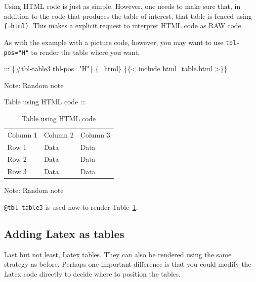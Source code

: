 \documentclass[
  12pt,
]{article}
\newenvironment{Shaded}{\begin{snugshade}}{\end{snugshade}}
\newcommand{\InformationTok}[1]{\textcolor[rgb]{0.37,0.37,0.37}{#1}}
\newcommand{\NormalTok}[1]{\textcolor[rgb]{0.00,0.23,0.31}{#1}}
\begin{document}
Using HTML code is just as simple. However, one needs to make sure that,
in addition to the code that produces the table of interest, that table
is fenced using
\texttt{\textasciigrave{}\textasciigrave{}\textasciigrave{}\{=html\}}.
This makes a explicit request to interpret HTML code as RAW code.

As with the example with a picture code, however, you may want to use
\texttt{tbl-pos="H"} to render the table where you want.

\begin{Shaded}
\begin{Highlighting}[]
\NormalTok{::: \{\#tbl{-}table3 tbl{-}pos="H"\}}
\InformationTok{\textasciigrave{}\textasciigrave{}\textasciigrave{}\{=html\}}
\InformationTok{\{\{\textless{} include html\_table.html \textgreater{}\}\}}
\InformationTok{\textasciigrave{}\textasciigrave{}\textasciigrave{}}

\NormalTok{Note: Random note}

\NormalTok{Table using HTML code  }
\NormalTok{:::}
\end{Highlighting}
\end{Shaded}

\begin{longtable}[]{@{}lll@{}}

\caption{\label{tbl-table3}Table using HTML code}

\tabularnewline

\toprule\noalign{}
\endhead
\bottomrule\noalign{}
\endlastfoot
Column 1 & Column 2 & Column 3 \\
Row 1 & Data & Data \\
Row 2 & Data & Data \\
Row 3 & Data & Data \\

\end{longtable}

Note: Random note

\texttt{@tbl-table3} is used now to render Table~\ref{tbl-table3}.

\subsection{Adding Latex as tables}\label{adding-latex-as-tables}

Last but not least, Latex tables. They can also be rendered using the
same strategy as before. Perhaps one important difference is that you
could modify the Latex code directly to decide where to position the
tables.
\end{document}
